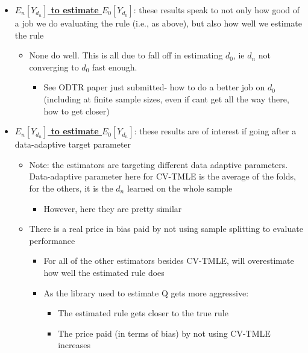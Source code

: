 \documentclass[11pt]{article}\usepackage[]{graphicx}\usepackage[]{color}
\begin{document}
\begin{itemize}
\begin{itemize}
    \end{itemize}
    \item \underline{\textbf{$E_n[Y_{d_n}]$ to estimate $E_0[Y_{d_0}]$}}: these results speak to not only how good of a job we do evaluating the rule (i.e., as above), but also how well we estimate the rule
    \begin{itemize}
        \item None do well. This is all due to fall off in estimating $d_0$, ie $d_n$ not converging to $d_0$ fast enough.
        \begin{itemize}
            \item See ODTR paper just submitted- how to do a better job on $d_0$ (including at finite sample sizes, even if cant get all the way there, how to get closer)
        \end{itemize}
    \end{itemize}
    \item \textbf{\underline{$E_n[Y_{d_n}]$ to estimate $E_0[Y_{d_n}]$}}: these results are of interest if going after a data-adaptive target parameter
    \begin{itemize}
        \item Note: the estimators are targeting different data adaptive parameters. Data-adaptive parameter here for CV-TMLE is the average of the folds, for the others, it is the $d_n$ learned on the whole sample
        \begin{itemize}
            \item However, here they are pretty similar
        \end{itemize}
        \item There is a real price in bias paid by not using sample splitting to evaluate performance
        \begin{itemize}
            \item For all of the other estimators besides CV-TMLE, will overestimate how well the estimated rule does
            \item As the library used to estimate Q gets more aggressive:
            \begin{itemize}
                \item The estimated rule gets closer to the true rule
                \item The price paid (in terms of bias) by not using CV-TMLE increases
            \end{itemize}
        \end{itemize}
    \end{itemize}
\end{itemize}
\end{document}
